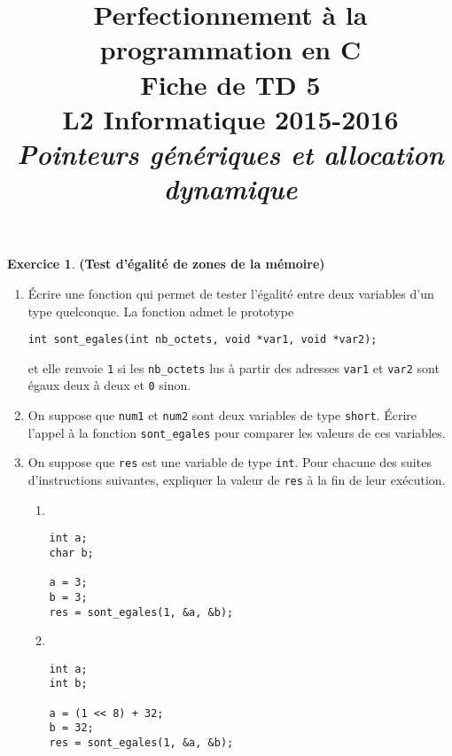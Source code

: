 \documentclass[12pt]{article}
\date{}
\title{{\bf Perfectionnement à la programmation en {\sf C}} \\
    Fiche de TD 5 \\
    {\small L2 Informatique 2015-2016} \\
    {\it \small Pointeurs génériques et allocation dynamique}}
\theoremstyle{definition}
\newtheorem{Exercice}{Exercice}
\begin{document}
\maketitle

\begin{Exercice} {\bf (Test d'égalité de zones de la mémoire)}\smallskip
\begin{enumerate}
    \item Écrire une fonction qui permet de tester l'égalité entre deux
    variables d'un type quelconque. La fonction admet le prototype
\begin{lstlisting}
int sont_egales(int nb_octets, void *var1, void *var2);
\end{lstlisting}
    et elle renvoie {\tt 1} si les {\tt nb\_octets} lus à partir des adresses
    {\tt var1} et {\tt var2} sont égaux deux à deux et {\tt 0} sinon.
    \smallskip

    \item On suppose que {\tt num1} et {\tt num2} sont deux variables
    de type {\tt short}. Écrire l'appel à la fonction {\tt sont\_egales}
    pour comparer les valeurs de ces variables.
    \smallskip

    \item On suppose que {\tt res} est une variable de type {\tt int}.
    Pour chacune des suites d'instructions suivantes, expliquer la
    valeur de {\tt res} à la fin de leur exécution.
    \begin{multicols}{2}
        \begin{enumerate}[label = ({\alph*})]
            \item ~
\begin{lstlisting}
int a;
char b;

a = 3;
b = 3;
res = sont_egales(1, &a, &b);
\end{lstlisting}

            \item ~
\begin{lstlisting}
int a;
int b;

a = (1 << 8) + 32;
b = 32;
res = sont_egales(1, &a, &b);
\end{lstlisting}
        \end{enumerate}
    \end{multicols}
\end{enumerate}
\end{Exercice}
\bigskip
\end{document}
